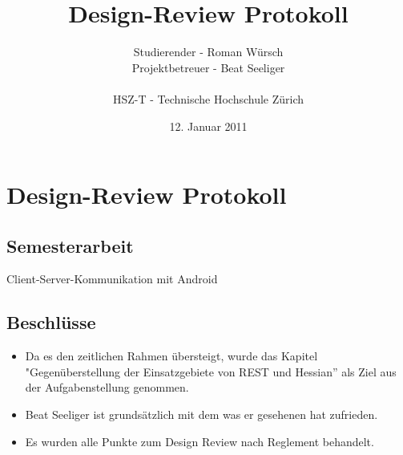 \documentclass[listof=totoc,bibliography=totoc]{scrreprt}
\title{Design-Review Protokoll}
\author{Studierender - Roman Würsch\\
    Projektbetreuer - Beat Seeliger\\
    \\
    HSZ-T - Technische Hochschule Zürich}
\date{12. Januar 2011}
\begin{document}
    \ifpdf
    \else
    \fi

    \maketitle



    \chapter{Design-Review Protokoll}

    \section{Semesterarbeit}
    Client-Server-Kommunikation mit Android

    \section{Beschlüsse}
    \begin{itemize}
        \item Da es den zeitlichen Rahmen übersteigt, wurde das Kapitel "Gegenüberstellung der Einsatzgebiete von REST und Hessian'' als Ziel aus der Aufgabenstellung genommen.
        \item Beat Seeliger ist grundsätzlich mit dem was er gesehenen hat zufrieden.
        \item Es wurden alle Punkte zum Design Review nach Reglement behandelt.
    \end{itemize}
    
\end{document}
